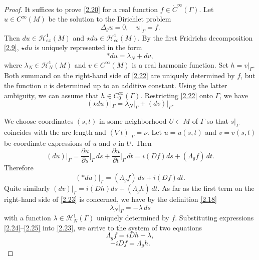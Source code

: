 \documentclass[12pt,reqno]{amsart}
\begin{document}
\begin{proof}
It suffices to prove \eqref{2.20} for a real function $f\in\dot C^\infty(\Gamma)$.
Let $u\in C^\infty(M)$ be the solution to the Dirichlet problem
$$
\Delta_gu=0,\quad u|_\Gamma=f.
$$
Then $du\in{\mathcal H}^1_{ex}(M)$ and $\star du\in{\mathcal H}^1_{co}(M)$. By the first Fridrichs decomposition \eqref{2.9}, $\star du$ is uniquely represented in the form
\begin{equation}
\ast du=\lambda_N+dv,
                                \label{2.22}
\end{equation}
where $\lambda_N\in{\mathcal H}^1_N(M)$ and $v\in C^\infty(M)$ is a real harmonic function. Set $h=v|_\Gamma$. Both summand on the right-hand side of \eqref{2.22} are uniquely determined by $f$, but the function $v$ is determined up to an additive constant. Using the latter ambiguity, we can assume that $h\in C^\infty_0(\Gamma)$.
Restricting \eqref{2.22} onto $\Gamma$, we have
\begin{equation}
(\star du)|_\Gamma=\lambda_N|_\Gamma+(dv)|_\Gamma.
                                \label{2.23}
\end{equation}

We choose coordinates $(s,t)$ in some neighborhood $U\subset M$ of $\Gamma$ so that $s|_\Gamma$ coincides with the arc length and
$(\nabla t)|_\Gamma=\nu$. Let $u=u(s,t)$ and $v=v(s,t)$ be coordinate expressions of $u$ and $v$ in $U$. Then
$$
(du)|_\Gamma=\frac{\partial u}{\partial s}\Big|_\Gamma\,ds+\frac{\partial u}{\partial t}\Big|_\Gamma\,dt
=i(Df)ds+(\Lambda_gf)\,dt.
$$
Therefore
\begin{equation}
(\ast du)|_\Gamma=(\Lambda_gf)\,ds+i(Df)dt.
                                \label{2.24}
\end{equation}
Quite similarly
$
(dv)|_\Gamma=i(Dh)ds+(\Lambda_gh)\,dt.
$
As far as the first term on the right-hand side of \eqref{2.23} is concerned, we have by the definition \eqref{2.18}
\begin{equation}
\lambda_N|_\Gamma=-\lambda\,ds
                                \label{2.25}
\end{equation}
with a function $\lambda\in{\mathcal H}^1_N(\Gamma)$ uniquely determined by $f$.
Substituting expressions \eqref{2.24}--\eqref{2.25} into \eqref{2.23}, we arrive to the system of two equations
\begin{equation}
\Lambda_gf=iDh-\lambda,
                                \label{2.26}
\end{equation}
\begin{equation}
-iDf=\Lambda_gh.
                                \label{2.27}
\end{equation}


\end{proof}
\end{document}
